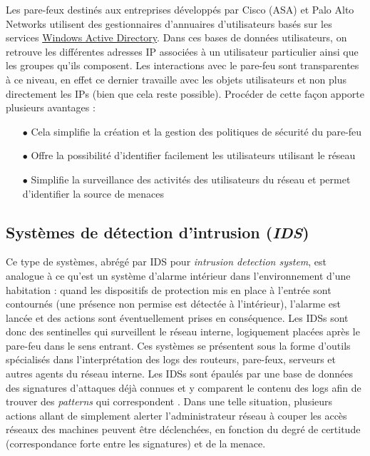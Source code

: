 \documentclass[]{article}
\begin{document}
\par Les pare-feux destinés aux entreprises développés par Cisco (ASA) \cite{cisco2018} et Palo Alto Networks \cite{Kokko2017} utilisent des gestionnaires d'annuaires d'utilisateurs basés sur les services \href{https://fr.wikipedia.org/wiki/Active_Directory}{Windows Active Directory}. Dans ces bases de données utilisateurs, on retrouve les différentes adresses IP associées à un utilisateur particulier ainsi que les groupes qu'ils composent. Les interactions avec le pare-feu sont transparentes à ce niveau, en effet ce dernier travaille avec les objets \og utilisateurs \fg et non plus directement les IPs (bien que cela reste possible). Procéder de cette façon apporte plusieurs avantages \cite{cisco2018}:
\vspace{0.2cm}
\begin{itemize}
\item[$\bullet$] Cela simplifie la création et la gestion des politiques de sécurité du pare-feu
\vspace{0.2cm}
\item[$\bullet$] Offre la possibilité d'identifier facilement les utilisateurs utilisant le réseau
\vspace{0.2cm}
\item[$\bullet$] Simplifie la surveillance des activités des utilisateurs du réseau et permet d'identifier la source de menaces
\end{itemize} 

\newpage

\subsection{Systèmes de détection d'intrusion (\textit{IDS})}\label{IDS}
Ce type de systèmes, abrégé par IDS pour \textit{intrusion detection system}, est analogue à ce qu'est un système d'alarme intérieur dans l'environnement d'une habitation : quand les dispositifs de protection mis en place à l'entrée sont contournés (une présence non permise est détectée à l'intérieur), l'alarme est lancée et des actions sont éventuellement prises en conséquence. Les IDSs sont donc des sentinelles qui surveillent le réseau interne, logiquement placées après le pare-feu dans le sens entrant. Ces systèmes se présentent sous la forme d'outils spécialisés dans l’interprétation des logs des routeurs, pare-feux, serveurs et autres agents du réseau interne. Les IDSs sont épaulés par une base de données des signatures d'attaques déjà connues et y comparent le contenu des logs afin de trouver des \textit{patterns} qui correspondent \cite{Shimonski2013}. Dans une telle situation, plusieurs actions allant de simplement alerter l'administrateur réseau à couper les accès réseaux des machines peuvent être déclenchées, en fonction du degré de certitude (correspondance forte entre les signatures) et de la menace.\\
\end{document}
